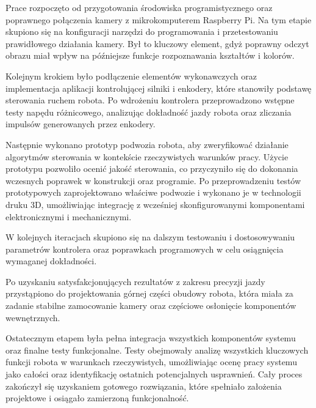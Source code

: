 Prace rozpoczęto od przygotowania środowiska programistycznego oraz poprawnego połączenia kamery z mikrokomputerem Raspberry Pi. Na tym etapie skupiono się na konfiguracji narzędzi do programowania i przetestowaniu prawidłowego działania kamery. Był to kluczowy element, gdyż poprawny odczyt obrazu miał wpływ na późniejsze funkcje rozpoznawania kształtów i kolorów.

Kolejnym krokiem było podłączenie elementów wykonawczych oraz implementacja aplikacji kontrolującej silniki i enkodery, które stanowiły podstawę sterowania ruchem robota. Po wdrożeniu kontrolera przeprowadzono wstępne testy napędu różnicowego, analizując dokładność jazdy robota oraz zliczania impulsów generowanych przez enkodery. 

Następnie wykonano prototyp podwozia robota, aby zweryfikować działanie algorytmów sterowania w kontekście rzeczywistych warunków pracy. Użycie prototypu pozwoliło ocenić jakość sterowania, co przyczyniło się do dokonania wczesnych poprawek w konstrukcji oraz programie. Po przeprowadzeniu testów prototypowych zaprojektowano właściwe podwozie i wykonano je w technologii druku 3D, umożliwiając integrację z wcześniej skonfigurowanymi komponentami elektronicznymi i mechanicznymi.

W kolejnych iteracjach skupiono się na dalszym testowaniu i dostosowywaniu parametrów kontrolera oraz poprawkach programowych w celu osiągnięcia wymaganej dokładności. 

Po uzyskaniu satysfakcjonujących rezultatów z zakresu precyzji jazdy przystąpiono do projektowania górnej części obudowy robota, która miała za zadanie stabilne zamocowanie kamery oraz częściowe osłonięcie komponentów wewnętrznych. 

Ostatecznym etapem była pełna integracja wszystkich komponentów systemu oraz finalne testy funkcjonalne. Testy obejmowały analizę wszystkich kluczowych funkcji robota w warunkach rzeczywistych, umożliwiając ocenę pracy systemu jako całości oraz identyfikację ostatnich potencjalnych usprawnień. Cały proces zakończył się uzyskaniem gotowego rozwiązania, które spełniało założenia projektowe i osiągało zamierzoną funkcjonalność.

